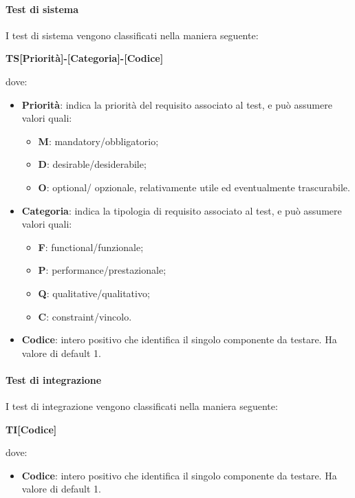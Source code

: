 		\paragraph{Test di sistema}
		I test di sistema vengono classificati nella maniera seguente:
		\begin{center}
			\textbf{TS[Priorità]-[Categoria]-[Codice]}
		\end{center}		 
		dove:\\
		\begin{itemize}
			\item \textbf{Priorità}: indica la priorità del requisito associato al test, e può assumere valori quali:
			\begin{itemize}
				\item \textbf{M}: mandatory/obbligatorio;
				\item \textbf{D}: desirable/desiderabile;
				\item \textbf{O}: optional/ opzionale, relativamente utile ed eventualmente trascurabile.
			\end{itemize}
			\item \textbf{Categoria}: indica la tipologia di requisito associato al test, e può assumere valori quali:
			\begin{itemize}
				\item \textbf{F}: functional/funzionale;
				\item \textbf{P}: performance/prestazionale;
				\item \textbf{Q}: qualitative/qualitativo;
				\item \textbf{C}: constraint/vincolo.
			\end{itemize}
			\item \textbf{Codice}: intero positivo che identifica il singolo componente da testare. Ha valore di default 1.
		\end{itemize}
		 
		\paragraph{Test di integrazione}
		I test di integrazione vengono classificati nella maniera seguente:
		\begin{center}
			\textbf{TI[Codice]}
		\end{center}	
		dove:\\
		\begin{itemize}
			\item \textbf{Codice}: intero positivo che identifica il singolo componente da testare. Ha valore di default 1.
		\end{itemize}		 
		
